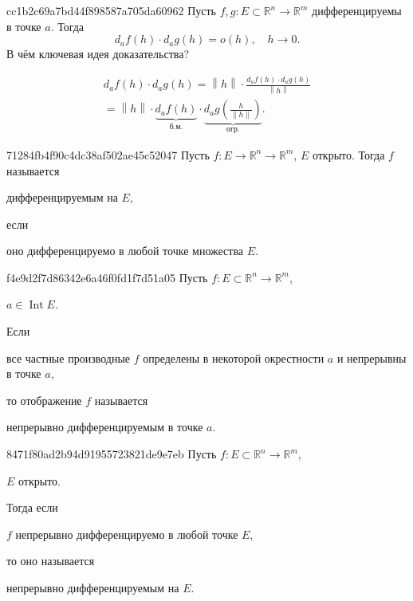 \begin{note}{cc1b2c69a7bd44f898587a705da60962}
    Пусть \({ f, g : E \subset \mathbb R^{n} \to \mathbb R^{m} }\) дифференцируемы в точке \({ a }\).
    Тогда
    \[
        d_{a}f(h) \cdot d_{a}g(h) = o(h), \quad h \to 0.
    \]
    В чём ключевая идея доказательства?

    \begin{cloze}{1}
        \begin{multline*}
            d_{a}f(h) \cdot d_{a}g(h) = \left\lVert h \right\rVert \cdot \frac{d_{a}f(h) \cdot d_{a}g(h)}{\left\lVert h \right\rVert} \\
            = \left\lVert h \right\rVert \cdot \underbrace{d_{a}f(h)}_{\text{б.м.}} \cdot \underbrace{d_{a}g\left(\frac{h}{\lVert h \rVert}\right)}_{\text{огр.}}.
        \end{multline*}
    \end{cloze}
\end{note}

\begin{note}{71284fb4f90c4dc38af502ae45c52047}
    Пусть \({ f : E \to \mathbb R^{n} \to \mathbb R^{m} }\),\: \({ E }\) открыто.
    Тогда \({ f }\) называется \begin{icloze}{2}дифференцируемым на \({ E }\),\end{icloze} если \begin{icloze}{1}оно дифференцируемо в любой точке множества \({ E }\).\end{icloze}
\end{note}

\begin{note}{f4e9d2f7d86342e6a46f0fd1f7d51a05}
    Пусть \({ f : E \subset \mathbb R^{n} \to \mathbb R^{m} }\),\: \begin{icloze}{2}\({ a \in \operatorname{Int} E }\).\end{icloze}
    Если \begin{icloze}{2}все частные производные \({ f }\) определены в некоторой окрестности \({ a }\) и непрерывны в точке \({ a }\),\end{icloze} то отображение \({ f }\) называется \begin{icloze}{1}непрерывно дифференцируемым в точке \({ a }\).\end{icloze}
\end{note}

\begin{note}{8471f80ad2b94d91955723821de9e7eb}
    Пусть \({ f : E \subset \mathbb R^{n} \to \mathbb R^{m} }\),\: \begin{icloze}{3}\({ E }\) открыто.\end{icloze}
    Тогда если \begin{icloze}{2}\({ f }\) непрерывно дифференцируемо в любой точке \({ E }\),\end{icloze} то оно называется \begin{icloze}{1}непрерывно дифференцируемым на \({ E }\).\end{icloze}
\end{note}

